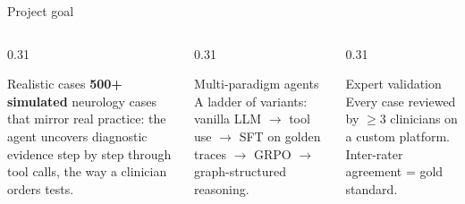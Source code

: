 \documentclass[aspectratio=169,t]{beamer}
\begin{document}
\begin{frame}{Project goal}
  \vspace{-5mm}
  \begin{columns}[T,onlytextwidth]
    \begin{column}{0.31\textwidth}
      \begin{block}{Realistic cases}
        \footnotesize
        \textbf{500+ simulated} neurology cases that mirror real
        practice: the agent uncovers diagnostic evidence step by
        step through tool calls, the way a clinician orders tests.
      \end{block}
    \end{column}%
    \hfill
    \begin{column}{0.31\textwidth}
      \begin{exampleblock}{Multi-paradigm agents}
        \footnotesize
        A ladder of variants: vanilla LLM $\rightarrow$ tool use
        $\rightarrow$ SFT on golden traces $\rightarrow$ GRPO
        $\rightarrow$ graph-structured reasoning.
      \end{exampleblock}
    \end{column}%
    \hfill
    \begin{column}{0.31\textwidth}
      \begin{alertblock}{Expert validation}
        \footnotesize
        Every case reviewed by $\geq$3 clinicians on a custom
        platform. \alert{Inter-rater agreement} = gold standard.
      \end{alertblock}
    \end{column}
  \end{columns}
\end{frame}
\end{document}
